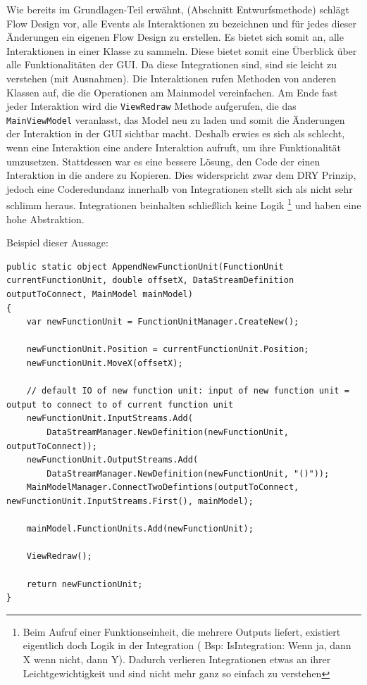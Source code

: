 Wie bereits im Grundlagen-Teil erwähnt, (Abschnitt Entwurfsmethode) schlägt Flow Design
vor, alle Events als Interaktionen zu bezeichnen und für jedes dieser
Änderungen ein eigenen Flow Design zu erstellen. 
Es bietet sich somit an, alle Interaktionen in einer Klasse zu sammeln.
Diese bietet somit eine Überblick über alle Funktionalitäten der GUI.
Da diese Integrationen sind, sind sie leicht zu verstehen (mit Ausnahmen). Die
Interaktionen rufen Methoden von anderen Klassen auf, die die Operationen am
Mainmodel vereinfachen. Am Ende fast jeder Interaktion wird die \texttt{ViewRedraw}
Methode aufgerufen, die das \texttt{MainViewModel} veranlasst, das Model neu zu
laden und somit die Änderungen der Interaktion in der GUI sichtbar macht.
Deshalb erwies es sich als schlecht, wenn eine Interaktion eine andere
Interaktion aufruft, um ihre Funktionalität umzusetzen. 
Stattdessen war es eine bessere Lösung, den Code der einen Interaktion in
die andere zu Kopieren. Dies widerspricht zwar dem DRY Prinzip, jedoch eine
Coderedundanz innerhalb von Integrationen stellt sich als nicht sehr schlimm
heraus. Integrationen beinhalten schließlich keine Logik \footnote{Beim
Aufruf einer Funktionseinheit, die mehrere Outputs liefert, existiert
eigentlich doch Logik in der Integration ( Bsp: IsIntegration: Wenn ja,
dann X wenn nicht, dann Y). Dadurch verlieren Integrationen etwas an ihrer
Leichtgewichtigkeit und sind nicht mehr ganz so einfach zu verstehen} und haben eine hohe
Abstraktion.

Beispiel dieser Aussage:
\begin{lstlisting}[caption=AppendNewFunctionUnit]
public static object AppendNewFunctionUnit(FunctionUnit currentFunctionUnit, double offsetX, DataStreamDefinition outputToConnect, MainModel mainModel)
{
	var newFunctionUnit = FunctionUnitManager.CreateNew();
	
	newFunctionUnit.Position = currentFunctionUnit.Position;
	newFunctionUnit.MoveX(offsetX);
	
	// default IO of new function unit: input of new function unit = output to connect to of current function unit
	newFunctionUnit.InputStreams.Add(
		DataStreamManager.NewDefinition(newFunctionUnit, outputToConnect));
	newFunctionUnit.OutputStreams.Add(
		DataStreamManager.NewDefinition(newFunctionUnit, "()"));
	MainModelManager.ConnectTwoDefintions(outputToConnect, newFunctionUnit.InputStreams.First(), mainModel);
	
	mainModel.FunctionUnits.Add(newFunctionUnit);
	
	ViewRedraw();
	
	return newFunctionUnit;
}
\end{lstlisting}


